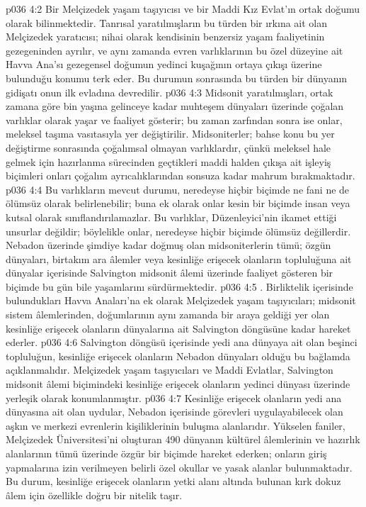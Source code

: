 \vs p036 4:2 Bir Melçizedek yaşam taşıyıcısı ve bir Maddi Kız Evlat’ın ortak doğumu  olarak bilinmektedir. Tanrısal yaratılmışların bu türden bir ırkına ait olan Melçizedek yaratıcısı; nihai olarak kendisinin benzersiz yaşam faaliyetinin gezegeninden ayrılır, ve aynı zamanda evren varlıklarının bu özel düzeyine ait Havva Ana’sı gezegensel doğumun yedinci kuşağının ortaya çıkışı üzerine bulunduğu konumu terk eder. Bu durumun sonrasında bu türden bir dünyanın gidişatı onun ilk evladına devredilir.
\vs p036 4:3 Midsonit yaratılmışları, ortak zamana göre bin yaşına gelinceye kadar muhteşem dünyaları üzerinde çoğalan varlıklar olarak yaşar ve faaliyet gösterir; bu zaman zarfından sonra ise onlar, meleksel taşıma vasıtasıyla yer değiştirilir. Midsoniterler; bahse konu bu yer değiştirme sonrasında çoğalımsal olmayan varlıklardır, çünkü meleksel hale gelmek için hazırlanma sürecinden geçtikleri maddi halden çıkışa ait işleyiş biçimleri onları çoğalım ayrıcalıklarından sonsuza kadar mahrum bırakmaktadır.
\vs p036 4:4 Bu varlıkların mevcut durumu, neredeyse hiçbir biçimde ne fani ne de ölümsüz olarak belirlenebilir; buna ek olarak onlar kesin bir biçimde insan veya kutsal olarak sınıflandırılamazlar. Bu varlıklar, Düzenleyici’nin ikamet ettiği unsurlar değildir; böylelikle onlar, neredeyse hiçbir biçimde ölümsüz değillerdir. Nebadon üzerinde şimdiye kadar doğmuş olan midsoniterlerin tümü; özgün dünyaları, birtakım ara âlemler veya kesinliğe erişecek olanların topluluğuna ait dünyalar içerisinde Salvington midsonit âlemi üzerinde faaliyet gösteren bir biçimde bu gün bile yaşamlarını sürdürmektedir.
\vs p036 4:5 . Birliktelik içerisinde bulundukları Havva Anaları’na ek olarak Melçizedek yaşam taşıyıcıları; midsonit sistem âlemlerinden, doğumlarının aynı zamanda bir araya geldiği yer olan kesinliğe erişecek olanların dünyalarına ait Salvington döngüsüne kadar hareket ederler.
\vs p036 4:6 Salvington döngüsü içerisinde yedi ana dünyaya ait olan beşinci topluluğun, kesinliğe erişecek olanların Nebadon dünyaları olduğu bu bağlamda açıklanmalıdır. Melçizedek yaşam taşıyıcıları ve Maddi Evlatlar, Salvington midsonit âlemi biçimindeki kesinliğe erişecek olanların yedinci dünyası üzerinde yerleşik olarak konumlanmıştır.
\vs p036 4:7 Kesinliğe erişecek olanların yedi ana dünyasına ait olan uydular, Nebadon içerisinde görevleri uygulayabilecek olan aşkın ve merkezi evrenlerin kişiliklerinin buluşma alanlarıdır. Yükselen faniler, Melçizedek Üniversitesi’ni oluşturan 490 dünyanın kültürel âlemlerinin ve hazırlık alanlarının tümü üzerinde özgür bir biçimde hareket ederken; onların giriş yapmalarına izin verilmeyen belirli özel okullar ve yasak alanlar bulunmaktadır. Bu durum, kesinliğe erişecek olanların yetki alanı altında bulunan kırk dokuz âlem için özellikle doğru bir nitelik taşır.
